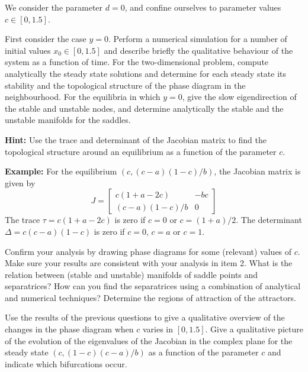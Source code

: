 \begin{Exercise}[name={A qualitative study without external influence}]\label{EX31}

We consider the parameter $d=0$, and confine ourselves to
parameter values $c \in [0,1.5]$.


\Question First consider the case $y=0$.  Perform a numerical
simulation for a number of initial values $x_0 \in [0,1.5]$ and
describe briefly the qualitative behaviour of the system as a function of time.
\Question For the two-dimensional problem, compute analytically the steady state solutions and determine for each steady state its stability and the topological structure of the
phase diagram in the neighbourhood. For the equilibria in which
$y=0$, give the slow eigendirection of the stable and unstable nodes, and determine analytically the stable and the unstable manifolds for the saddles. 

\textbf{Hint:} Use the trace and determinant of the Jacobian matrix  to find the topological structure around an equilibrium as a function of the parameter $c$. 

\textbf{Example:}
For the equilibrium $(c,(c - a)(1-c)/b)$, the Jacobian matrix is given by
\begin{equation} 
J=\left[ \begin{array}{cc} 
c(1+a-2c) &  -b c \\
(c-a)(1-c)/b &  0 
\end{array} \right] \nonumber
\end{equation}
The trace $\tau = c(1+a-2c)$ is zero if $c=0$ or $c = (1+a)/2$. The determinant $\Delta = c(c-a)(1-c)$ is zero if $c=0$, $c=a$ or $c=1$. 

\Question Confirm your analysis by drawing phase diagrams for some (relevant) values of $c$. 
Make sure your results are consistent with your analysis in item 2. What is the relation between (stable and unstable) manifolds
of saddle points and separatrices? How can you find the separatrices using a
combination of analytical and numerical techniques?  Determine the
regions of attraction of the attractors. 

\Question Use the results of the previous questions to give a
qualitative overview of the changes in the phase diagram when $c$
varies in $[0, 1.5]$. Give a qualitative picture of the evolution
of the eigenvalues of the Jacobian in the complex plane for the
steady state $(c,(1-c)(c-a)/b)$ as a function of the parameter $c$ and indicate which bifurcations occur.  


\end{Exercise}

